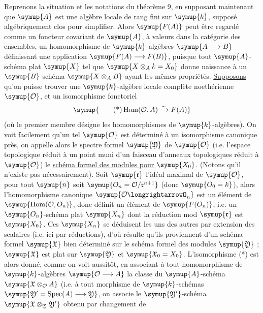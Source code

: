 Reprenons la situation et les notations du théorème 9, en supposant maintenant
que $\symup{A}$ est une algèbre locale de rang fini sur $\symup{k}$, supposé algébriquement
clos pour simplifier. Alors $\symup{F(A)}$ peut être regardé comme un foncteur
covariant de $\symup{A}$, à valeurs dans la catégorie des ensembles, un homomorphisme
de $\symup{k}$-algèbres $\symup{A\longrightarrow B}$ définissant une application
$\symup{F(A)\longrightarrow F(B)}$, puisque tout $\symup{A}$-schéma plat $\symup{X}$ tel que
$\symup{X\otimes_A k=X_0}$ donne naissance à un $\symup{B}$-schéma $\symup{X\otimes_A B}$ ayant les
mêmes propriétés. \uline{Supposons} qu'on puisse trouver une $\symup{k}$-algèbre locale
complète noethérienne $\symup{\mathcal O}$, et un isomorphisme fonctoriel
\begin{equation}
  \symup{\tag{*}
  \operatorname{Hom}(\mathcal O,A)\xrightarrow{\sim}F(A)}
\end{equation}
(où le premier membre désigne les homomorphismes de $\symup{k}$-algèbres). On voit
facilement qu'un tel $\symup{\mathcal O}$ est déterminé à un isomorphisme canonique
près, on appelle alors le spectre formel $\symup{\mathfrak Y}$ de $\symup{\mathcal O}$ (i.e.
l'espace topologique réduit à un point muni d'un faisceau d'anneaux
topologiques réduit à $\symup{\mathcal O}$) le \uline{schéma formel des modules pour}
$\symup{X_0}$. (Notons qu'il n'existe pas nécessairement). Soit $\symup{\mathfrak r}$ l'idéal
maximal de $\symup{\mathcal O}$, pour tout $\symup{n}$ soit
$\symup{O_n=\mathcal O/\mathfrak r^{n+1}}$ (donc $\symup{O_0=k}$), alors
l'homomorphisme canonique $\symup{\mathcal O\longrightarrowO_n}$ est un
élément de $\symup{\operatorname{Hom}(\mathcal O,O_n)}$, donc définit un
élément de $\symup{F(O_n)}$, i.e. un $\symup{O_n}$-schéma plat $\symup{X_n}$ dont la
réduction mod $\symup{\mathfrak r}$ est $\symup{X_0}$. Ces $\symup{X_n}$ se déduisent les uns des
autres par extension des scalaires (i.e. ici par réductions), d'où résulte
qu'ils proviennent d'un schéma formel $\symup{\mathfrak X}$ bien déterminé sur le
schéma formel des modules $\symup{\mathfrak Y}$ ; $\symup{\mathfrak X}$ est plat sur
$\symup{\mathfrak Y}$ et $\symup{\mathfrak X_0=X_0}$. L'isomorphisme (*) est alors donné,
comme on voit aussitôt, en associant à tout homomorphisme de $\symup{k}$-algèbres
$\symup{\mathcal O\longrightarrow A}$ la classe du $\symup{A}$-schéma
$\symup{\mathfrak X\otimes_{\mathcal O}A}$ (i.e. à tout morphisme de $\symup{k}$-schémas
$\symup{\mathfrak Y'=\operatorname{Spec}(A)\longrightarrow\mathfrak Y}$, on associe le
$\symup{\mathfrak Y'}$-schéma $\symup{\mathfrak X\otimes_{\mathfrak Y}\mathfrak Y'}$ obtenu par changement de
